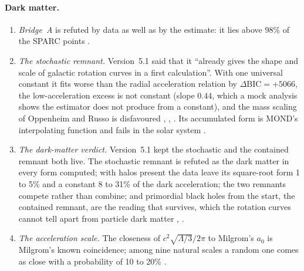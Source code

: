 \paragraph{Dark matter.}
\begin{enumerate}
\item \emph{Bridge~A} is refuted by data as well as by the estimate: it lies above 98\% of the SPARC points .
\item \emph{The stochastic remnant.} Version~5.1 said that it ``already gives the shape and scale of galactic rotation curves in a first
calculation''. With one universal constant it fits worse than the radial acceleration relation by $\Delta\mathrm{BIC}=+5066$, the low-acceleration
excess is not constant (slope $0.44$, which a mock analysis shows the estimator does not produce from a constant), and the mass scaling of
Oppenheim and Russo is disfavoured , , . Its accumulated form is MOND's interpolating function
and fails in the solar system .
\item \emph{The dark-matter verdict.} Version~5.1 kept the stochastic and the contained remnant both live. The stochastic remnant is refuted
as the dark matter in every form computed; with halos present the data leave its square-root form 1 to 5\% and a constant 8 to 31\% of the
dark acceleration; the two remnants compete rather than combine; and primordial black holes from the start, the contained remnant, are
the reading that survives, which the rotation curves cannot tell apart from particle dark matter , .
\item \emph{The acceleration scale.} The closeness of $c^2\sqrt{\Lambda/3}/2\pi$ to Milgrom's $a_0$ is Milgrom's known coincidence; among
nine natural scales a random one comes as close with a probability of 10 to 20\% .
\end{enumerate}

